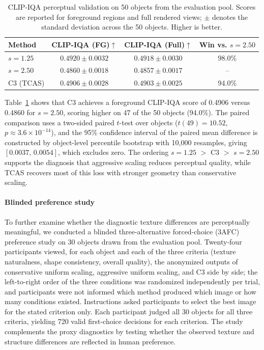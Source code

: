 \documentclass[times,twocolumn,final]{elsarticle}
\begin{document}
\begin{table}[t]
\centering
\caption{CLIP-IQA perceptual validation on 50 objects from the evaluation pool. Scores are reported for foreground regions and full rendered views; $\pm$ denotes the standard deviation across the 50 objects. Higher is better.}
\label{tab:clipiqa}
\footnotesize\setlength{\tabcolsep}{4pt}
\begin{tabular}{lccc}
\toprule
Method & CLIP-IQA (FG)$\uparrow$ & CLIP-IQA (Full)$\uparrow$ & Win vs. $s=2.50$ \\
\midrule
$s = 1.25$ & $\mathbf{0.4920 \pm 0.0032}$ & $\mathbf{0.4918 \pm 0.0030}$ & $\mathbf{98.0\%}$ \\
$s = 2.50$ & $0.4860 \pm 0.0018$ & $0.4857 \pm 0.0017$ & -- \\
C3 (TCAS) & $0.4906 \pm 0.0028$ & $0.4903 \pm 0.0025$ & 94.0\% \\
\bottomrule
\end{tabular}
\end{table}

Table~\ref{tab:clipiqa} shows that C3 achieves a foreground CLIP-IQA score of 0.4906 versus 0.4860 for $s = 2.50$, scoring higher on 47 of the 50 objects (94.0\%). The paired comparison uses a two-sided paired $t$-test over objects ($t(49)=10.52$, $p\approx3.6\times10^{-14}$), and the 95\% confidence interval of the paired mean difference is constructed by object-level percentile bootstrap with 10{,}000 resamples, giving $[0.0037,\,0.0054]$, which excludes zero. The ordering $s = 1.25$ $>$ C3 $>$ $s = 2.50$ supports the diagnosis that aggressive scaling reduces perceptual quality, while TCAS recovers most of this loss with stronger geometry than conservative scaling.

\paragraph{Blinded preference study}
To further examine whether the diagnostic texture differences are perceptually meaningful, we conducted a blinded three-alternative forced-choice (3AFC) preference study on 30 objects drawn from the evaluation pool. Twenty-four participants viewed, for each object and each of the three criteria (texture naturalness, shape consistency, overall quality), the anonymized outputs of conservative uniform scaling, aggressive uniform scaling, and C3 side by side; the left-to-right order of the three conditions was randomized independently per trial, and participants were not informed which method produced which image or how many conditions existed. Instructions asked participants to select the best image for the stated criterion only. Each participant judged all 30 objects for all three criteria, yielding 720 valid first-choice decisions for each criterion. The study complements the proxy diagnostics by testing whether the observed texture and structure differences are reflected in human preference.
\end{document}
